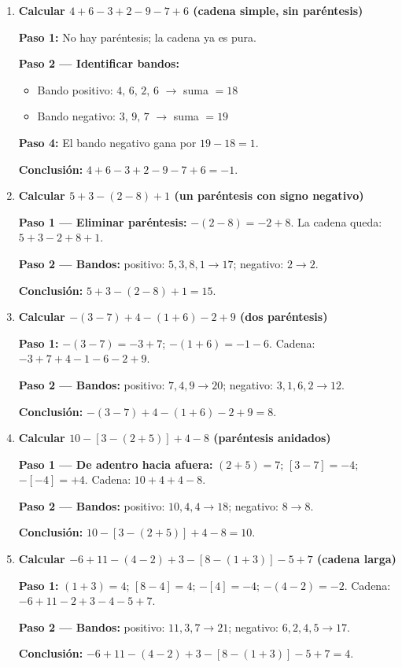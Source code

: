 \documentclass[11pt, letterpaper]{article}
\begin{document}
\begin{tcolorbox}[examplebox, title={Ejemplos --- m\'etodo de la cuerda}]
\begin{enumerate}[label=\textbf{Ej. \arabic*.}, leftmargin=*, itemsep=12pt]

\item \textbf{Calcular $4+6-3+2-9-7+6$ (cadena simple, sin par\'entesis)}

\textbf{Paso 1:} No hay par\'entesis; la cadena ya es pura.

\textbf{Paso 2 --- Identificar bandos:}
\begin{itemize}[itemsep=2pt]
  \item Bando positivo: $4,\,6,\,2,\,6$ $\to$ suma $=18$
  \item Bando negativo: $3,\,9,\,7$ $\to$ suma $=19$
\end{itemize}

\textbf{Paso 4:} El bando negativo gana por $19-18=1$.

\textbf{Conclusi\'on:} $4+6-3+2-9-7+6=-1$.

\item \textbf{Calcular $5+3-(2-8)+1$ (un par\'entesis con signo negativo)}

\textbf{Paso 1 --- Eliminar par\'entesis:} $-(2-8)=-2+8$. La cadena queda: $5+3-2+8+1$.

\textbf{Paso 2 --- Bandos:} positivo: $5,3,8,1\to 17$; negativo: $2\to 2$.

\textbf{Conclusi\'on:} $5+3-(2-8)+1=15$.

\item \textbf{Calcular $-(3-7)+4-(1+6)-2+9$ (dos par\'entesis)}

\textbf{Paso 1:} $-(3-7)=-3+7$; $-(1+6)=-1-6$. Cadena: $-3+7+4-1-6-2+9$.

\textbf{Paso 2 --- Bandos:} positivo: $7,4,9\to 20$; negativo: $3,1,6,2\to 12$.

\textbf{Conclusi\'on:} $-(3-7)+4-(1+6)-2+9=8$.

\item \textbf{Calcular $10-[3-(2+5)]+4-8$ (par\'entesis anidados)}

\textbf{Paso 1 --- De adentro hacia afuera:} $(2+5)=7$; $[3-7]=-4$; $-[-4]=+4$. Cadena: $10+4+4-8$.

\textbf{Paso 2 --- Bandos:} positivo: $10,4,4\to 18$; negativo: $8\to 8$.

\textbf{Conclusi\'on:} $10-[3-(2+5)]+4-8=10$.

\item \textbf{Calcular $-6+11-(4-2)+3-[8-(1+3)]-5+7$ (cadena larga)}

\textbf{Paso 1:} $(1+3)=4$; $[8-4]=4$; $-[4]=-4$; $-(4-2)=-2$. Cadena: $-6+11-2+3-4-5+7$.

\textbf{Paso 2 --- Bandos:} positivo: $11,3,7\to 21$; negativo: $6,2,4,5\to 17$.

\textbf{Conclusi\'on:} $-6+11-(4-2)+3-[8-(1+3)]-5+7=4$.

\end{enumerate}
\end{tcolorbox}
\end{document}

